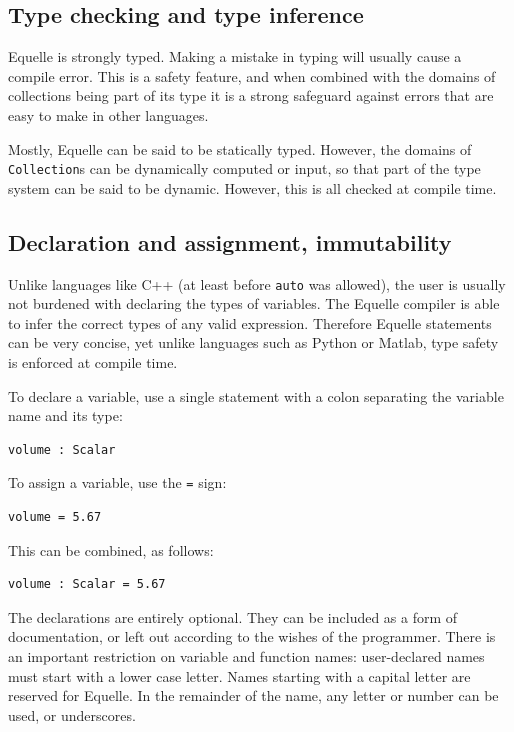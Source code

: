 \documentclass[11pt]{article}
\newcommand{\code}[1]{\texttt{#1}}
\begin{document}
\subsection{Type checking and type inference}

Equelle is strongly typed. Making a mistake in typing will usually cause a compile
error. This is a safety feature, and when combined with the domains of collections being
part of its type it is a strong safeguard against errors that are easy to make in other
languages.

Mostly, Equelle can be said to be statically typed. However, the domains of
\code{Collection}s can be dynamically computed or input, so that part of the type system
can be said to be dynamic. However, this is all checked at compile time.

\subsection{Declaration and assignment, immutability}

Unlike languages like C++ (at least before \code{auto} was allowed), the user is usually
not burdened with declaring the types of variables. The Equelle compiler is able to infer
the correct types of any valid expression. Therefore Equelle statements can be very
concise, yet unlike languages such as Python or Matlab, type safety is enforced at compile
time.

To declare a variable, use a single statement with a colon separating the variable name
and its type:

\begin{verbatim}
volume : Scalar
\end{verbatim}

To assign a variable, use the \code{=} sign:

\begin{verbatim}
volume = 5.67
\end{verbatim}

This can be combined, as follows:

\begin{verbatim}
volume : Scalar = 5.67
\end{verbatim}

The declarations are entirely optional. They can be included as a form of documentation,
or left out according to the wishes of the programmer. There is an important restriction
on variable and function names: user-declared names must start with a lower case
letter. Names starting with a capital letter are reserved for Equelle. In the remainder of
the name, any letter or number can be used, or underscores.
\end{document}
